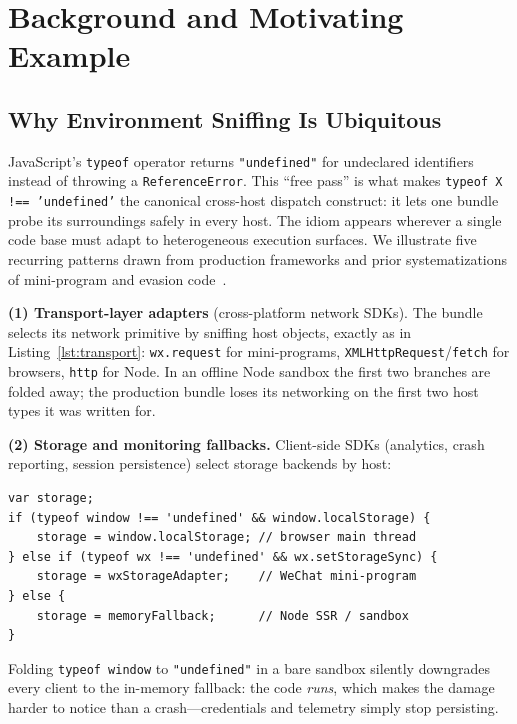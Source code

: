 \documentclass[sigconf,nonacm]{acmart}
\begin{document}
\section{Background and Motivating Example}\label{sec:background}

\subsection{Why Environment Sniffing Is Ubiquitous}

JavaScript's \texttt{typeof} operator returns \texttt{"undefined"} for undeclared identifiers instead of throwing a \texttt{ReferenceError}. This ``free pass'' is what makes \texttt{typeof X !== 'undefined'} the canonical cross-host dispatch construct: it lets one bundle probe its surroundings safely in every host. The idiom appears wherever a single code base must adapt to heterogeneous execution surfaces. We illustrate five recurring patterns drawn from production frameworks and prior systematizations of mini-program and evasion code~\cite{wemint,fv8,appsecret}.

\textbf{(1) Transport-layer adapters} (cross-platform network SDKs). The bundle selects its network primitive by sniffing host objects, exactly as in Listing~\ref{lst:transport}: \texttt{wx.request} for mini-programs, \texttt{XMLHttpRequest}/\texttt{fetch} for browsers, \texttt{http} for Node. In an offline Node sandbox the first two branches are folded away; the production bundle loses its networking on the first two host types it was written for.

\textbf{(2) Storage and monitoring fallbacks.} Client-side SDKs (analytics, crash reporting, session persistence) select storage backends by host:

\begin{lstlisting}[caption={Storage fallback selection.}, label={lst:storage}]
var storage;
if (typeof window !== 'undefined' && window.localStorage) {
    storage = window.localStorage; // browser main thread
} else if (typeof wx !== 'undefined' && wx.setStorageSync) {
    storage = wxStorageAdapter;    // WeChat mini-program
} else {
    storage = memoryFallback;      // Node SSR / sandbox
}
\end{lstlisting}

Folding \texttt{typeof window} to \texttt{"undefined"} in a bare sandbox silently downgrades every client to the in-memory fallback: the code \emph{runs}, which makes the damage harder to notice than a crash---credentials and telemetry simply stop persisting.
\end{document}
